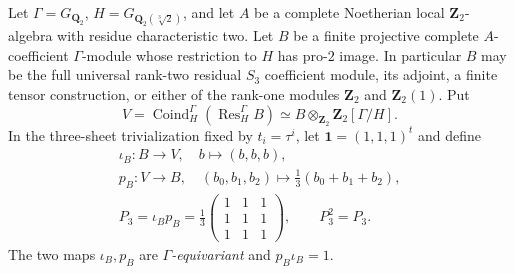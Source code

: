 \begin{theorem}
\label{thm:dyadic-f134-strict-hecke-coinduced-chain}
Let
$\Gamma=G_{\mathbf Q_2}$,
$H=G_{\mathbf Q_2(\sqrt[3]2)}$,
and let $A$ be a complete
Noetherian local
$\mathbf Z_2$-algebra
with residue
characteristic two.
Let $B$ be a finite
projective complete
$A$-coefficient
$\Gamma$-module whose
restriction to $H$
has pro-$2$ image.
In particular $B$
may be the full
universal rank-two
residual $S_3$
coefficient module,
its adjoint, a
finite tensor
construction, or
either of the
rank-one modules
$\mathbf Z_2$ and
$\mathbf Z_2(1)$.
Put
\begin{equation}\label{eq:dyadic-f134-coinduced-permutation-bundle}
V=\operatorname{Coind}_H^\Gamma
(\operatorname{Res}_H^\Gamma B)
\simeq B\otimes_{\mathbf Z_2}
\mathbf Z_2[\Gamma/H].
\end{equation}
In the three-sheet
trivialization
fixed by $t_i=\tau^i$,
let $\mathbf1=(1,1,1)^t$
and define
\begin{equation}\label{eq:dyadic-f134-average-three-sheet}
\boxed{
\begin{gathered}
\iota_B:B\longrightarrow V,\quad
b\longmapsto (b,b,b),\\
p_B:V\longrightarrow B,\quad
(b_0,b_1,b_2)
\longmapsto\tfrac13(b_0+b_1+b_2),\\
P_3=\iota_Bp_B=
\frac13
\begin{pmatrix}
1&1&1\\
1&1&1\\
1&1&1
\end{pmatrix},
\qquad P_3^2=P_3.
\end{gathered}}
\end{equation}
The two maps
$\iota_B,p_B$ are
\emph{$\Gamma$-equivariant}
and $p_B\iota_B=1$.


\end{theorem}
